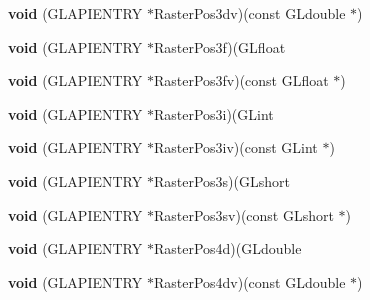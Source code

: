 \begin{DoxyCompactItemize}
\item 
\mbox{\label{struct_____g_ldispatch_table_rec_a76ddb9e11f1a2e6c521b14063e71943e}} 
{\bfseries void} (G\+L\+A\+P\+I\+E\+N\+T\+RY $\ast$Raster\+Pos3dv)(const G\+Ldouble $\ast$)
\item 
\mbox{\label{struct_____g_ldispatch_table_rec_acdb64ec400869d8b8cdeaf687f73eb1d}} 
{\bfseries void} (G\+L\+A\+P\+I\+E\+N\+T\+RY $\ast$Raster\+Pos3f)(G\+Lfloat
\item 
\mbox{\label{struct_____g_ldispatch_table_rec_a07bfb0c5d2309347fdf7ae2d86f3ada0}} 
{\bfseries void} (G\+L\+A\+P\+I\+E\+N\+T\+RY $\ast$Raster\+Pos3fv)(const G\+Lfloat $\ast$)
\item 
\mbox{\label{struct_____g_ldispatch_table_rec_a4d7ea046048ef5649196f4b807d8f5a0}} 
{\bfseries void} (G\+L\+A\+P\+I\+E\+N\+T\+RY $\ast$Raster\+Pos3i)(G\+Lint
\item 
\mbox{\label{struct_____g_ldispatch_table_rec_a9ab72f27607b27b3ba59f27cf7c499dc}} 
{\bfseries void} (G\+L\+A\+P\+I\+E\+N\+T\+RY $\ast$Raster\+Pos3iv)(const G\+Lint $\ast$)
\item 
\mbox{\label{struct_____g_ldispatch_table_rec_ae130e94db5d2ae4004c17c4bdbd804e5}} 
{\bfseries void} (G\+L\+A\+P\+I\+E\+N\+T\+RY $\ast$Raster\+Pos3s)(G\+Lshort
\item 
\mbox{\label{struct_____g_ldispatch_table_rec_a026f0b9bfed699832f7b913d3b185c58}} 
{\bfseries void} (G\+L\+A\+P\+I\+E\+N\+T\+RY $\ast$Raster\+Pos3sv)(const G\+Lshort $\ast$)
\item 
\mbox{\label{struct_____g_ldispatch_table_rec_a91ec97a3e6cc3abd836bcea1a8aadcd8}} 
{\bfseries void} (G\+L\+A\+P\+I\+E\+N\+T\+RY $\ast$Raster\+Pos4d)(G\+Ldouble
\item 
\mbox{\label{struct_____g_ldispatch_table_rec_ada8e0ac30adf7ac5e77ceb5a9414cc7f}} 
{\bfseries void} (G\+L\+A\+P\+I\+E\+N\+T\+RY $\ast$Raster\+Pos4dv)(const G\+Ldouble $\ast$)

\end{DoxyCompactItemize}
